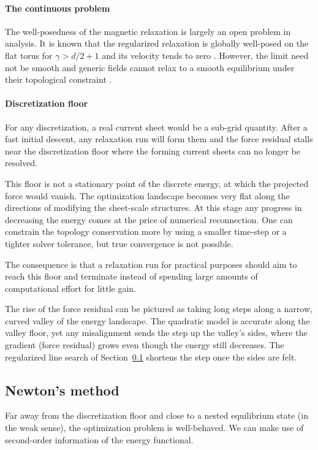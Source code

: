 \documentclass[%
 reprint,
 superscriptaddress,
 amsmath,amssymb,
 aps, nofootinbib, floatfix]{revtex4-2}
\begin{document}
\paragraph{The continuous problem}
The well-posedness of the magnetic relaxation is largely an open problem in analysis. It is known that the regularized relaxation is globally well-posed on the flat torus for $\gamma > d/2 + 1$ and its velocity tends to zero \citep{beekie_moffatts_2022, bae_local_2025}. However, the limit need not be smooth and generic fields cannot relax to a smooth equilibrium under their topological constraint \citep{cieliebak_note_2017, enciso_obstructions_2025}. 

\paragraph{Discretization floor}
For any discretization, a real current sheet would be a sub-grid quantity. After a fast initial descent, any relaxation run will form them and the force residual stalls near the discretization floor where the forming current sheets can no longer be resolved.

This floor is not a stationary point of the discrete energy, at which the projected force would vanish. The optimization landscape becomes very flat along the directions of modifying the sheet-scale structures. At this stage any progress in decreasing the energy comes at the price of numerical reconnection. One can constrain the topology conservation more by using a smaller time-step or a tighter solver tolerance, but true convergence is not possible.   

The consequence is that a relaxation run for practical purposes should aim to reach this floor and terminate instead of spending large amounts of computational effort for little gain.

The rise of the force residual can be pictured as taking long steps along a narrow, curved valley of the energy landscape. The quadratic model is accurate along the valley floor, yet any misalignment sends the step up the valley's sides, where the gradient (force residual) grows even though the energy still decreases. The regularized line search of Section~\ref{sec:newtons_method} shortens the step once the sides are felt.

\subsection{Newton's method}
\label{sec:newtons_method}
Far away from the discretization floor and close to a nested equilibrium state (in the weak sense), the optimization problem is well-behaved. We can make use of second-order information of the energy functional.
\end{document}
